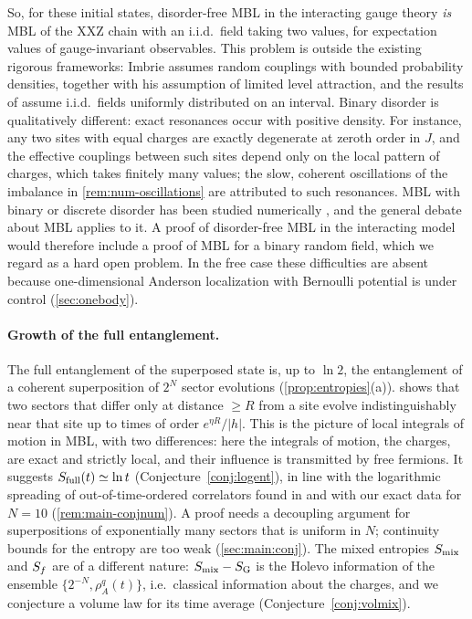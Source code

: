 So, for these initial states, disorder-free MBL in the interacting gauge theory \emph{is} MBL of the XXZ chain
with an i.i.d.\ field taking two values, for expectation values of gauge-invariant observables.  This problem is
outside the existing rigorous frameworks: Imbrie \cite{Imbrie2016} assumes random couplings with bounded probability
densities, together with his assumption of limited level attraction, and the results of \cite{DHMP2023,DGHP2024}
assume i.i.d.\ fields uniformly distributed on an interval.  Binary disorder is qualitatively different: exact
resonances occur with positive density.  For instance, any two sites with equal charges are exactly degenerate at
zeroth order in $J$, and the effective couplings between such sites depend only on the local pattern of charges,
which takes finitely many values; the slow, coherent oscillations of the imbalance in \cref{rem:num-oscillations}
are attributed to such resonances.  MBL with binary or
discrete disorder has been studied numerically \cite{Andraschko2014,Tang2015,Janarek2018}, and the general debate
about MBL \cite{Suntajs2020,SelsPolkovnikov2021,Abanin2021challenges,DeRoeckHuveneers2017,Morningstar2022}
applies to it.  A proof of disorder-free MBL in the interacting model would therefore include a proof of MBL for a
binary random field, which we regard as a hard open problem.  In the free case these difficulties are absent
because one-dimensional Anderson localization with Bernoulli potential is under control (\cref{sec:onebody}).

\paragraph{Growth of the full entanglement.}
The full entanglement of the superposed state is, up to $\ln2$, the entanglement of a coherent superposition of
$2^N$ sector evolutions (\cref{prop:entropies}(a)).   shows that two sectors that differ only at
distance $\ge R$ from a site evolve indistinguishably near that site up to times of order $e^{\eta R}/|h|$.  This is
the picture of local integrals of motion in MBL, with two differences: here the integrals of motion, the charges, are
exact and strictly local, and their influence is transmitted by free fermions.  It suggests
$S_{\mathrm{full}}(t)\simeq\ln t$ (Conjecture~\ref{conj:logent}), in line with the logarithmic spreading of out-of-time-ordered
correlators found in \cite{SKKM2019} and with our exact data for $N=10$ (\cref{rem:main-conjnum}).  A proof needs a
decoupling argument for superpositions of exponentially many sectors that is uniform in $N$; continuity bounds for
the entropy are too weak (\cref{sec:main:conj}).  The mixed entropies $S_{\mathrm{mix}}$ and $S_{f}$ are of a different nature:
$S_{\mathrm{mix}}-S_{\mathrm{G}}$ is the Holevo information of the ensemble $\{2^{-N},\rho^q_A(t)\}$, i.e.\ classical information about the
charges, and we conjecture a volume law for its time average (Conjecture~\ref{conj:volmix}).

